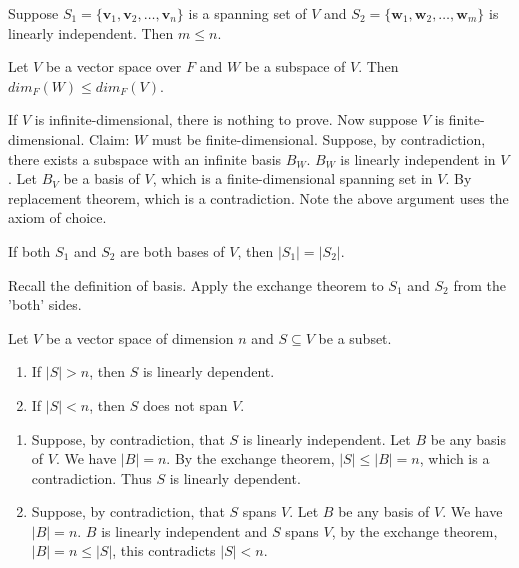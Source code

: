 \documentclass[12pt]{article}
\begin{document}
\begin{theorem}
    Suppose $S_1=\{\mathbf{v}_1,\mathbf{v}_2, \ldots ,\mathbf{v}_n\}$ is a spanning set of $V$ and
    $S_2=\{\mathbf{w}_1, \mathbf{w}_2, \ldots ,\mathbf{w}_m\}$ is linearly independent.
    Then $m\leq n$.
\end{theorem}

\begin{theorem}
    Let $V$ be a vector space over $F$ and $W$ be a subspace of $V$. Then $dim_F(W)\leq dim_F(V)$.
\end{theorem}

\begin{pf}
    If $V$ is infinite-dimensional, there is nothing to prove.
    Now suppose $V$ is finite-dimensional. Claim: $W$ must be finite-dimensional.
    Suppose, by contradiction, there exists a subspace with an infinite basis $B_W$. $B_W$ is linearly independent in $V$. 
    Let $B_V$ be a basis of $V$, which is a finite-dimensional spanning set in $V$. By replacement theorem, which is a contradiction.
    Note the above argument uses the axiom of choice.
\end{pf}

\begin{theorem}
    If both $S_1$ and $S_2$ are both bases of $V$, then $|S_1|=|S_2|$.
\end{theorem}
\begin{tcolorbox}[boxrule=0.5pt]
\begin{pf}  
    Recall the definition of basis.
    Apply the exchange theorem to $S_1$ and $S_2$ from the 'both' sides.
\end{pf}
\end{tcolorbox}


\begin{theorem}
    Let $V$ be a vector space of dimension $n$ and $S\subseteq V$ be a subset.
    \begin{enumerate}
        \item If $|S|>n$, then $S$ is linearly dependent.
        \item If $|S|<n$, then $S$ does not span $V$.
    \end{enumerate}
\end{theorem}

\begin{tcolorbox}[boxrule=0.5pt]
\begin{pf}  
    \begin{enumerate}
    \item Suppose, by contradiction, that $S$ is linearly independent. 
    Let $B$ be any basis of $V$. We have $|B|=n$.
    By the exchange theorem, $|S|\leq|B|=n$, which is a contradiction.
    Thus $S$ is linearly dependent.
    \item Suppose, by contradiction, that $S$ spans $V$.
    Let $B$ be any basis of $V$. We have $|B|=n$.
    $B$ is linearly independent and $S$ spans $V$,
    by the exchange theorem, $|B|=n\leq|S|$, this contradicts $|S|<n$.
    \end{enumerate}
\end{pf}
\end{tcolorbox}
\end{document}
